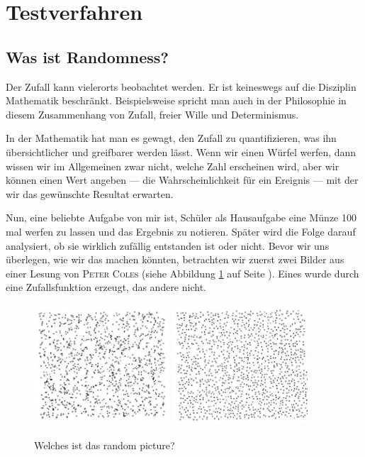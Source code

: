 \documentclass[%
11pt,%
twoside,%
titlepage,%
german,%
headsepline%
]{scrartcl}
\begin{document}
\section{Testverfahren}

\subsection{Was ist Randomness?}
Der Zufall kann vielerorts beobachtet werden. Er ist keineswegs auf die Disziplin Mathematik beschränkt. Beispielsweise spricht man auch in der Philosophie in diesem Zusammenhang von Zufall, freier Wille und Determinismus.

In der Mathematik hat man es gewagt, den Zufall zu quantifizieren, was ihn über\-sich\-tli\-cher und greifbarer werden lässt. Wenn wir einen Würfel werfen, dann wissen wir im Allgemeinen zwar nicht, welche Zahl erscheinen wird, aber wir können einen Wert angeben --- die Wahrscheinlichkeit für ein Ereignis --- mit der wir das gewünschte Resultat erwarten.

Nun, eine beliebte Aufgabe von mir ist, Schüler als Hausaufgabe eine Münze 100 mal werfen zu lassen und das Ergebnis zu notieren. Später wird die Folge darauf analysiert, ob sie wirklich zufällig entstanden ist oder nicht. Bevor wir uns überlegen, wie wir das machen könnten, betrachten wir zuerst zwei Bilder aus einer Lesung von \textsc{Peter Coles} (siehe Abbildung \ref{fig:randomness} auf Seite \pageref{fig:randomness}). Eines wurde durch eine Zufallsfunktion erzeugt, das andere nicht.  

\begin{figure}[h]
    \centering
    \includegraphics[width=0.45\textwidth]{pictures/pointa.jpg}
    \includegraphics[width=0.45\textwidth]{pictures/pointb.jpg}
    \caption{Welches ist das \glqq random picture\grqq?}
    \label{fig:randomness}
\end{figure}
\end{document}
